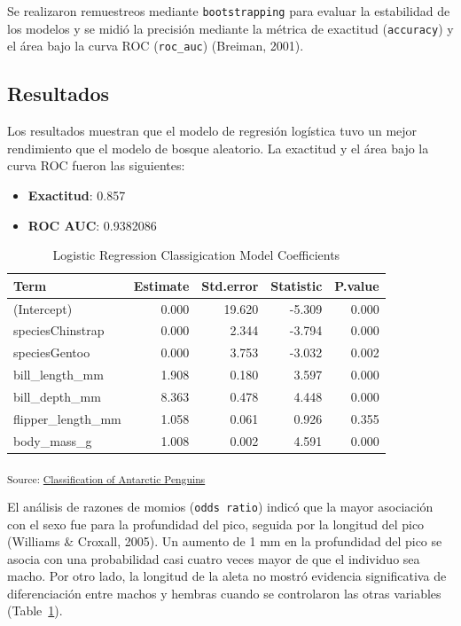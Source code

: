\documentclass[
]{agujournal2019}
\providecommand{\tightlist}{%
  \setlength{\itemsep}{0pt}\setlength{\parskip}{0pt}}\usepackage{longtable,booktabs,array}
\begin{document}
Se realizaron remuestreos mediante \texttt{bootstrapping} para evaluar
la estabilidad de los modelos y se midió la precisión mediante la
métrica de exactitud (\texttt{accuracy}) y el área bajo la curva ROC
(\texttt{roc\_auc}) (Breiman, 2001).

\subsection{Resultados}\label{resultados}

Los resultados muestran que el modelo de regresión logística tuvo un
mejor rendimiento que el modelo de bosque aleatorio. La exactitud y el
área bajo la curva ROC fueron las siguientes:

\begin{itemize}
\tightlist
\item
  \textbf{Exactitud}: 0.857\\
\item
  \textbf{ROC AUC}: 0.9382086
\end{itemize}

\begin{longtable}[]{@{}lrrrr@{}}

\caption{\label{tbl-res}Logistic Regression Classigication Model
Coefficients}

\tabularnewline

\toprule\noalign{}
Term & Estimate & Std.error & Statistic & P.value \\
\midrule\noalign{}
\endhead
\bottomrule\noalign{}
\endlastfoot
(Intercept) & 0.000 & 19.620 & -5.309 & 0.000 \\
speciesChinstrap & 0.000 & 2.344 & -3.794 & 0.000 \\
speciesGentoo & 0.000 & 3.753 & -3.032 & 0.002 \\
bill\_length\_mm & 1.908 & 0.180 & 3.597 & 0.000 \\
bill\_depth\_mm & 8.363 & 0.478 & 4.448 & 0.000 \\
flipper\_length\_mm & 1.058 & 0.061 & 0.926 & 0.355 \\
body\_mass\_g & 1.008 & 0.002 & 4.591 & 0.000 \\

\end{longtable}

\textsubscript{Source:
\href{https://sofiazorrilla.github.io/taller_quarto_ms/notebooks/ClassificationModel-preview.html\#cell-tbl-res}{Classification
of Antarctic Penguins}}

El análisis de razones de momios (\texttt{odds\ ratio}) indicó que la
mayor asociación con el sexo fue para la profundidad del pico, seguida
por la longitud del pico (Williams \& Croxall, 2005). Un aumento de 1 mm
en la profundidad del pico se asocia con una probabilidad casi cuatro
veces mayor de que el individuo sea macho. Por otro lado, la longitud de
la aleta no mostró evidencia significativa de diferenciación entre
machos y hembras cuando se controlaron las otras variables
(Table~\ref{tbl-res}).
\end{document}
